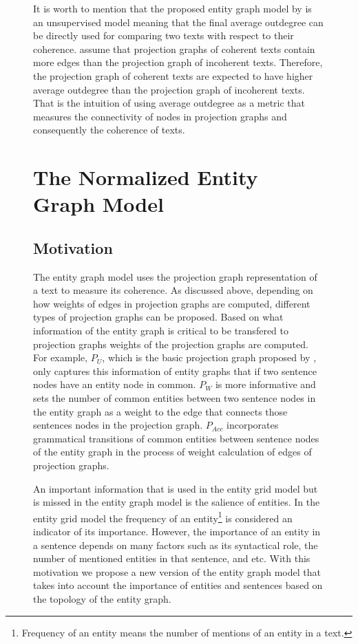 \begin{figure}[!t]
It is worth to mention that the proposed entity graph model by  is an unsupervised model meaning that the final average outdegree can be directly used for comparing two texts with respect to their coherence. 
 assume that projection graphs of coherent texts contain more edges than the projection graph of  incoherent texts. 
Therefore, the projection graph of coherent texts are expected to have higher average outdegree than the projection graph of incoherent texts.  
That is the intuition of using average outdegree as a metric that measures the connectivity of nodes in projection graphs and consequently the coherence of texts. 


\section{The Normalized Entity Graph Model}
%
\subsection{Motivation}
%
The entity graph model uses the projection graph representation of a text to measure its coherence. 
As discussed above, depending on how weights of edges in projection graphs are computed, different types of projection graphs can be proposed. 
Based on what information of the entity graph is critical to be transfered to projection graphs weights of the projection graphs are computed.
For example, $P_U$, which is the basic projection graph proposed by , only captures this information of  entity graphs that if two sentence nodes have an entity node in common. 
$P_W$ is more informative and sets the number of common entities between two sentence nodes in the entity graph as a weight to the edge that connects those sentences nodes in the projection graph. 
$P_{Acc}$ incorporates grammatical transitions of common entities between sentence nodes of the entity graph in the process of weight calculation of edges of projection graphs. 


An important information that is used in the entity grid model but is missed in the entity graph model is the salience of entities. 
In the entity grid model the frequency of an entity\footnote{Frequency of an entity means the number of mentions of an entity in a text.} is considered an indicator of its importance. 
However, the importance of an entity in a sentence depends on many factors such as its syntactical role, the number of mentioned entities in that sentence, and etc. 
With this motivation we propose a new version of the entity graph model that takes into account the importance of entities and sentences based on the topology of the entity graph. 


\end{figure}
